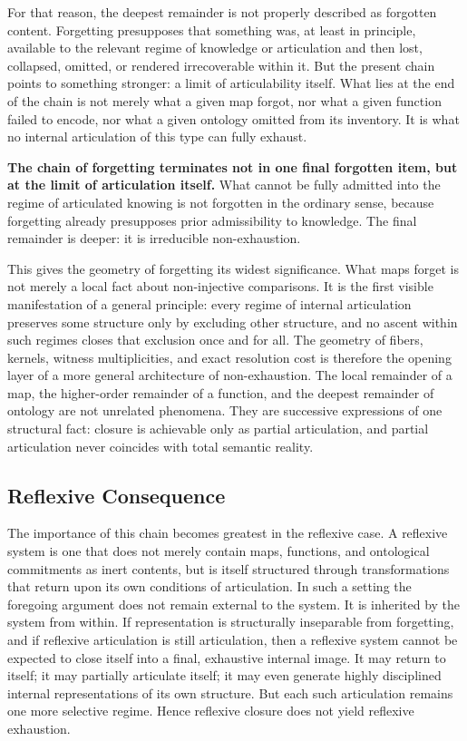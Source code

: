 \documentclass[11pt,a4paper]{article}
\newenvironment{keybox}[1]{%
  \Needspace*{8\baselineskip}%
  \begin{tcolorbox}[
    enhanced,
    breakable=false,
    colback=blue!5,
    colframe=blue!45!black,
    coltitle=black,
    colbacktitle=blue!14,
    boxrule=0.85pt,
    arc=2.5pt,
    left=9pt, right=9pt, top=6pt, bottom=6pt,
    titlerule=0.55pt,
    fonttitle=\bfseries,
    title={#1},
    before upper=\raggedright,
    before skip=0.9\baselineskip,
    after skip=0.9\baselineskip
  ]%
}{%
  \end{tcolorbox}%
}
\theoremstyle{plain}
\theoremstyle{definition}
\theoremstyle{remark}
\begin{document}
For that reason, the deepest remainder is not properly described as forgotten content. Forgetting presupposes that something was, at least in principle, available to the relevant regime of knowledge or articulation and then lost, collapsed, omitted, or rendered irrecoverable within it. But the present chain points to something stronger: a limit of articulability itself. What lies at the end of the chain is not merely what a given map forgot, nor what a given function failed to encode, nor what a given ontology omitted from its inventory. It is what no internal articulation of this type can fully exhaust.

\begin{keybox}{Limit of articulation}
\textbf{The chain of forgetting terminates not in one final forgotten item, but at the limit of articulation itself.} What cannot be fully admitted into the regime of articulated knowing is not forgotten in the ordinary sense, because forgetting already presupposes prior admissibility to knowledge. The final remainder is deeper: it is irreducible non-exhaustion.
\end{keybox}

This gives the geometry of forgetting its widest significance. What maps forget is not merely a local fact about non-injective comparisons. It is the first visible manifestation of a general principle: every regime of internal articulation preserves some structure only by excluding other structure, and no ascent within such regimes closes that exclusion once and for all. The geometry of fibers, kernels, witness multiplicities, and exact resolution cost is therefore the opening layer of a more general architecture of non-exhaustion. The local remainder of a map, the higher-order remainder of a function, and the deepest remainder of ontology are not unrelated phenomena. They are successive expressions of one structural fact: closure is achievable only as partial articulation, and partial articulation never coincides with total semantic reality.

\subsection{Reflexive Consequence}
\label{sec:representation-as-structured-forgetting:reflexive}

The importance of this chain becomes greatest in the reflexive case. A reflexive system is one that does not merely contain maps, functions, and ontological commitments as inert contents, but is itself structured through transformations that return upon its own conditions of articulation. In such a setting the foregoing argument does not remain external to the system. It is inherited by the system from within. If representation is structurally inseparable from forgetting, and if reflexive articulation is still articulation, then a reflexive system cannot be expected to close itself into a final, exhaustive internal image. It may return to itself; it may partially articulate itself; it may even generate highly disciplined internal representations of its own structure. But each such articulation remains one more selective regime. Hence reflexive closure does not yield reflexive exhaustion.
\end{document}
